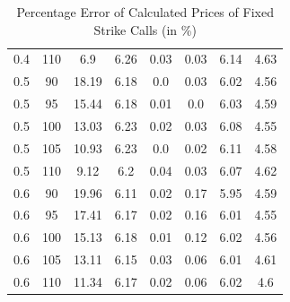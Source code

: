 \documentclass[12pt]{report}
\begin{document}
\begin{table}[H]
\begin{tabular}{|c|c|c|c|c|c|c|c|}
  0.4 & 110 & 6.9 & 6.26 & 0.03 & 0.03 & 6.14 & 4.63 \\
  0.5 & 90 & 18.19 & 6.18 & 0.0 & 0.03 & 6.02 & 4.56 \\
  0.5 & 95 & 15.44 & 6.18 & 0.01 & 0.0 & 6.03 & 4.59 \\
  0.5 & 100 & 13.03 & 6.23 & 0.02 & 0.03 & 6.08 & 4.55 \\
  0.5 & 105 & 10.93 & 6.23 & 0.0 & 0.02 & 6.11 & 4.58 \\
  0.5 & 110 & 9.12 & 6.2 & 0.04 & 0.03 & 6.07 & 4.62 \\
  0.6 & 90 & 19.96 & 6.11 & 0.02 & 0.17 & 5.95 & 4.59 \\
  0.6 & 95 & 17.41 & 6.17 & 0.02 & 0.16 & 6.01 & 4.55 \\
  0.6 & 100 & 15.13 & 6.18 & 0.01 & 0.12 & 6.02 & 4.56 \\
  0.6 & 105 & 13.11 & 6.15 & 0.03 & 0.06 & 6.01 & 4.61 \\
  0.6 & 110 & 11.34 & 6.17 & 0.02 & 0.06 & 6.02 & 4.6 \\
  \hline
  \end{tabular}
  \caption{Percentage Error of Calculated Prices of Fixed Strike Calls (in \%)}
  \label{table:name}
\end{table}
\end{document}
